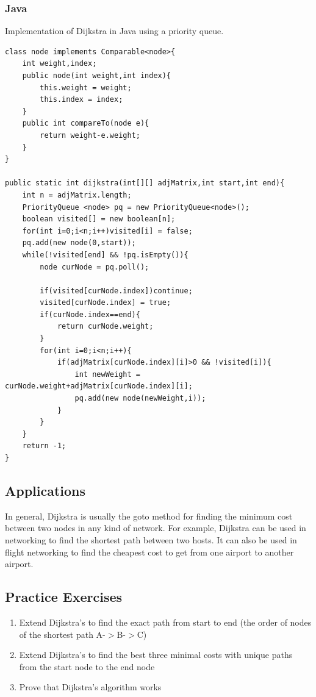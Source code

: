 \documentclass[11pt,oneside]{book}
\begin{document}
\subsubsection{Java}

Implementation of Dijkstra in Java using a priority queue.

\begin{lstlisting}
class node implements Comparable<node>{
    int weight,index;
    public node(int weight,int index){
        this.weight = weight;
        this.index = index;
    }
    public int compareTo(node e){
        return weight-e.weight;
    }
}

public static int dijkstra(int[][] adjMatrix,int start,int end){
    int n = adjMatrix.length;
    PriorityQueue <node> pq = new PriorityQueue<node>();
    boolean visited[] = new boolean[n];
    for(int i=0;i<n;i++)visited[i] = false;
    pq.add(new node(0,start));
    while(!visited[end] && !pq.isEmpty()){
        node curNode = pq.poll();
    
        if(visited[curNode.index])continue;
        visited[curNode.index] = true;
        if(curNode.index==end){
            return curNode.weight;
        }
        for(int i=0;i<n;i++){
            if(adjMatrix[curNode.index][i]>0 && !visited[i]){
                int newWeight = curNode.weight+adjMatrix[curNode.index][i];
                pq.add(new node(newWeight,i));
            }
        }
    }
    return -1;
}
\end{lstlisting}

\subsection{Applications}

In general, Dijkstra is usually the goto method for finding the minimum cost between two nodes in any kind of network. For example, Dijkstra can be used in networking to find the shortest path between two hosts. It can also be used in flight networking to find the cheapest cost to get from one airport to another airport.

\subsection{Practice Exercises}

\begin{enumerate}
\item Extend Dijkstra's to find the exact path from start to end (the order of nodes of the shortest path A-$>$B-$>$C)
\item Extend Dijkstra's to find the best three minimal costs with unique paths from the start node to the end node
\item Prove that Dijkstra's algorithm works
\end{enumerate}
\end{document}
